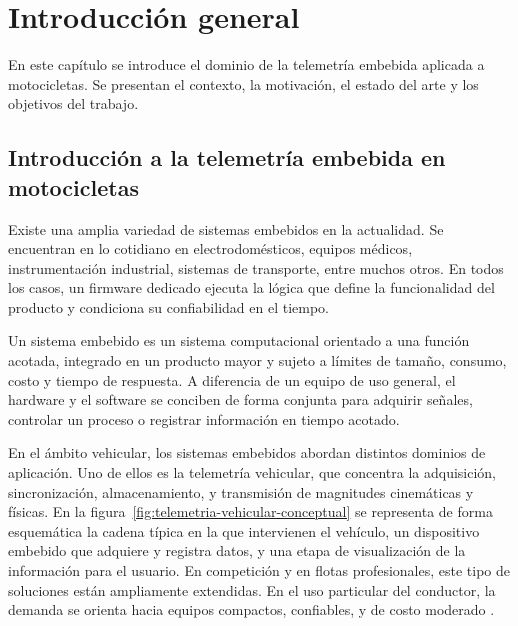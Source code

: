 
\chapter{Introducción general}

\label{Chapter1}
\label{IntroGeneral}

En este capítulo se introduce el dominio de la telemetría embebida aplicada a motocicletas. Se presentan el contexto, la motivación, el estado del arte y los objetivos del trabajo.


\newcommand{\keyword}[1]{\textbf{#1}}
\newcommand{\tabhead}[1]{\textbf{#1}}
\newcommand{\grados}{$^{\circ}$}

\section{Introducción a la telemetría embebida en motocicletas}
\label{sec:intro-general-tema}

Existe una amplia variedad de sistemas embebidos en la actualidad. Se encuentran en lo cotidiano en electrodomésticos, equipos médicos, instrumentación industrial, sistemas de transporte, entre muchos otros. En todos los casos, un firmware dedicado ejecuta la lógica que define la funcionalidad del producto y condiciona su confiabilidad en el tiempo.

Un sistema embebido es un sistema computacional orientado a una función acotada, integrado en un producto mayor y sujeto a límites de tamaño, consumo, costo y tiempo de respuesta. A diferencia de un equipo de uso general, el hardware y el software se conciben de forma conjunta para adquirir señales, controlar un proceso o registrar información en tiempo acotado.

En el ámbito vehicular, los sistemas embebidos abordan distintos dominios de aplicación. Uno de ellos es la telemetría vehicular, que concentra la adquisición, sincronización, almacenamiento, y transmisión de magnitudes cinemáticas y físicas. En la figura~\ref{fig:telemetria-vehicular-conceptual} se representa de forma esquemática la cadena típica en la que intervienen el vehículo, un dispositivo embebido que adquiere y registra datos, y una etapa de visualización de la información para el usuario. En competición y en flotas profesionales, este tipo de soluciones están ampliamente extendidas. En el uso particular del conductor, la demanda se orienta hacia equipos compactos, confiables, y de costo moderado \citep{garcia2026_moto_telemetry}.

